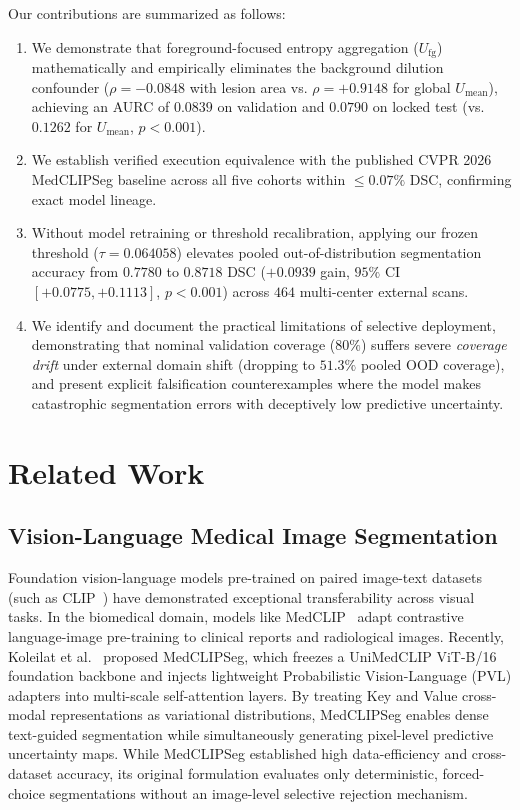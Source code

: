 \documentclass[10pt,journal,compsoc]{IEEEtran}
\begin{document}
Our contributions are summarized as follows:
\begin{enumerate}
    \item We demonstrate that foreground-focused entropy aggregation ($U_{\mathrm{fg}}$) mathematically and empirically eliminates the background dilution confounder ($\rho = -0.0848$ with lesion area vs. $\rho = +0.9148$ for global $U_{\mathrm{mean}}$), achieving an AURC of $0.0839$ on validation and $0.0790$ on locked test (vs. $0.1262$ for $U_{\mathrm{mean}}$, $p < 0.001$).
    \item We establish verified execution equivalence with the published CVPR 2026 MedCLIPSeg baseline across all five cohorts within $\le 0.07\%$ DSC, confirming exact model lineage.
    \item Without model retraining or threshold recalibration, applying our frozen threshold ($\tau = 0.064058$) elevates pooled out-of-distribution segmentation accuracy from $0.7780$ to $0.8718$ DSC ($+0.0939$ gain, $95\%$ CI $[+0.0775, +0.1113]$, $p < 0.001$) across $464$ multi-center external scans.
    \item We identify and document the practical limitations of selective deployment, demonstrating that nominal validation coverage ($80\%$) suffers severe \emph{coverage drift} under external domain shift (dropping to $51.3\%$ pooled OOD coverage), and present explicit falsification counterexamples where the model makes catastrophic segmentation errors with deceptively low predictive uncertainty.
\end{enumerate}

\section{Related Work}

\subsection{Vision-Language Medical Image Segmentation}
Foundation vision-language models pre-trained on paired image-text datasets (such as CLIP~\cite{radford2021learning}) have demonstrated exceptional transferability across visual tasks. In the biomedical domain, models like MedCLIP~\cite{wang2022medclip} adapt contrastive language-image pre-training to clinical reports and radiological images. Recently, Koleilat et al.~\cite{koleilat2026medclipseg} proposed MedCLIPSeg, which freezes a UniMedCLIP ViT-B/16 foundation backbone and injects lightweight Probabilistic Vision-Language (PVL) adapters into multi-scale self-attention layers. By treating Key and Value cross-modal representations as variational distributions, MedCLIPSeg enables dense text-guided segmentation while simultaneously generating pixel-level predictive uncertainty maps. While MedCLIPSeg established high data-efficiency and cross-dataset accuracy, its original formulation evaluates only deterministic, forced-choice segmentations without an image-level selective rejection mechanism.
\end{document}
